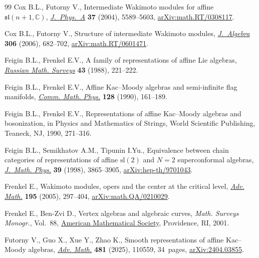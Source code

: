 \begin{thebibliography}{99}
Cox B.L., Futorny V., Intermediate {W}akimoto modules for affine
 {$\mathfrak{sl}(n+1,\mathbb{C})$},
 \href{https://doi.org/10.1088/0305-4470/37/21/006}{\textit{J.~Phys.~A}}
 \textbf{37} (2004), 5589--5603,
 \href{http://arxiv.org/abs/math.RT/0308117}{arXiv:math.RT/0308117}.

Cox B.L., Futorny V., Structure of intermediate {W}akimoto modules,
 \href{https://doi.org/10.1016/j.jalgebra.2006.08.019}{\textit{J.~Algebra}}
 \textbf{306} (2006), 682--702,
 \href{http://arxiv.org/abs/math.RT/0601471}{arXiv:math.RT/0601471}.

Feigin B.L., Frenkel E.V., A family of representations of affine {L}ie
 algebras,
 \href{https://doi.org/10.1070/RM1988v043n05ABEH001935}{\textit{Russian Math.
 Surveys}} \textbf{43} (1988), 221--222.

Feigin B.L., Frenkel E.V., Affine {K}ac--{M}oody algebras and semi-infinite
 flag manifolds, \href{https://doi.org/10.1007/BF02097051}{\textit{Comm. Math.
 Phys.}} \textbf{128} (1990), 161--189.

Feigin B.L., Frenkel E.V., Representations of affine {K}ac--{M}oody algebras
 and bosonization, in Physics and Mathematics of Strings, World Scientific
 Publishing, Teaneck, NJ, 1990, 271--316.

Feigin B.L., Semikhatov A.M., Tipunin I.Yu., Equivalence between chain
 categories of representations of affine {$\mathrm{sl}(2)$} and {$N=2$}
 superconformal algebras,
 \href{https://doi.org/10.1063/1.532473}{\textit{J.~Math. Phys.}} \textbf{39}
 (1998), 3865--3905,
 \href{http://arxiv.org/abs/hep-th/9701043}{arXiv:hep-th/9701043}.

Frenkel E., Wakimoto modules, opers and the center at the critical level,
 \href{https://doi.org/10.1016/j.aim.2004.08.002}{\textit{Adv. Math.}}
 \textbf{195} (2005), 297--404,
 \href{http://arxiv.org/abs/math.QA/0210029}{arXiv:math.QA/0210029}.

Frenkel E., Ben-Zvi D., Vertex algebras and algebraic curves, \textit{Math.
 Surveys Monogr.}, Vol.~88, \href{https://doi.org/10.1090/surv/088}{American
 Mathematical Society}, Providence, RI, 2001.

Futorny V., Guo X., Xue Y., Zhao K., Smooth representations of affine
 {K}ac--{M}oody algebras,
 \href{https://doi.org/10.1016/j.aim.2025.110559}{\textit{Adv. Math.}}
 \textbf{481} (2025), 110559, 34~pages,
 \href{http://arxiv.org/abs/2404.03855}{arXiv:2404.03855}.


\end{thebibliography}
